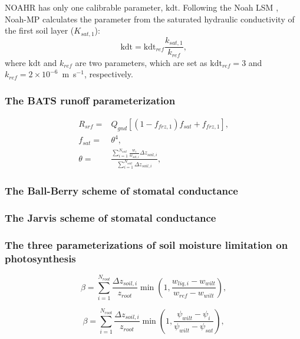 \documentclass[essd]{copernicus}
\begin{document}
NOAHR has only one calibrable parameter, $\mathrm{kdt}$. Following the Noah LSM \citep{chen2001MWR}, Noah-MP calculates the parameter from the saturated hydraulic conductivity of the first soil layer ($K_{sat,1}$):
\begin{equation}
    \mathrm{kdt} = \mathrm{kdt}_{ref} \frac{k_{sat,1}}{k_{ref}} \text{,}
\end{equation}
where $\mathrm{kdt}$ and $k_{ref}$ are two parameters, which are set as $\mathrm{kdt}_{ref} = 3$ and $k_{ref}=2 \times 10^{-6}$~m~s$^{-1}$, respectively.


\subsubsection{The BATS runoff parameterization}
\begin{align}
    R_{srf} = & Q_{gnd} \left[ (1 - f_{frz,1}) f_{sat} + f_{frz,1} \right] \text{,} \\
    f_{sat} = & \theta^4 \text{,} \\
    \theta =  & \frac{\sum_{i=1}^{N_{soil}}\frac{w_i}{w_{sat,i}}\Delta z_{soil,i}}{\sum_{i=1}^{N_{soil}}\Delta z_{soil,i}} \text{,}
\end{align}




\subsubsection{The Ball-Berry scheme of stomatal conductance}


\subsubsection{The Jarvis scheme of stomatal conductance}


\subsubsection{The three parameterizations of soil moisture limitation on photosynthesis}

\begin{equation}
    \beta = \sum_{i=1}^{N_{root}} \frac{\Delta z_{soil,i}}{z_{root}}
    \min\left(1, \frac{w_{liq,i} - w_{wilt}}{w_{ref} - w_{wilt}}\right)
    \text{,}
\end{equation}

\begin{equation}
    \beta = \sum_{i=1}^{N_{root}} \frac{\Delta z_{soil,i}}{z_{root}}
    \min\left(1, \frac{\psi_{wilt} - \psi_{i}}{\psi_{wilt} - \psi_{sat}}\right)
    \text{,}
\end{equation}
\end{document}
